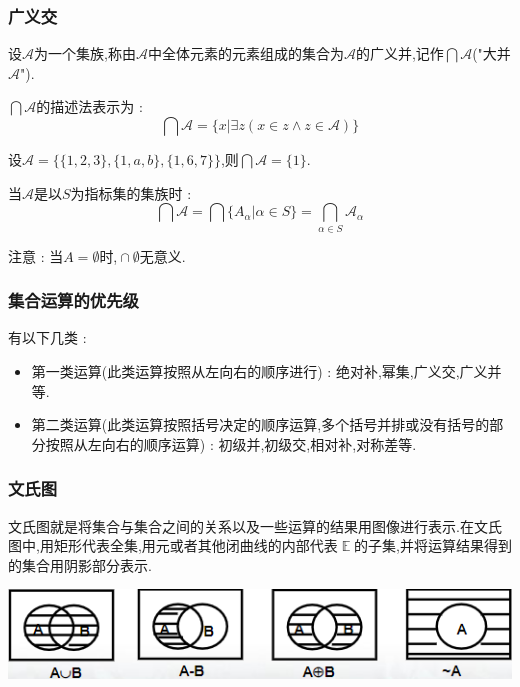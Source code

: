 \documentclass[UTF8,12pt]{ctexbook}
\DeclareMathOperator{\mathEverythingCollection}{\mathbb{E}}
\DeclareMathOperator{\intersectionSet}{\cap}
\begin{document}
{{{{\subsubsection{广义交}{
  设$\mathcal{A}$为一个集族,称由$\mathcal{A}$中全体元素的元素组成的集合为$\mathcal{A}$的广义并,记作$\bigcap \mathcal{A}$("大并$\mathcal{A}$").

  $\bigcap \mathcal{A}$的描述法表示为 : $$
    \bigcap\mathcal{A} = \{x | \exists z (x \in z \land z \in \mathcal{A})\}
  $$

  设$\mathcal{A} = \{\{1,2,3\},\{1,a,b\},\{1,6,7\}\}$,则$\bigcap \mathcal{A} = \{1\}$.

  当$\mathcal{A}$是以$S$为指标集的集族时 : $$
    \bigcap\mathcal{A} = \bigcap\{A_\alpha | \alpha \in S\} = \bigcap_{\alpha \in S}\mathcal{A}_\alpha
  $$

  注意 : 当$A = \emptyset$时,$\intersectionSet \emptyset$无意义.
}%

\subsubsection{集合运算的优先级}{
  有以下几类 :

  \begin{itemize}
    \item 第一类运算(此类运算按照从左向右的顺序进行) : 绝对补,幂集,广义交,广义并等.
    \item 第二类运算(此类运算按照括号决定的顺序运算,多个括号并排或没有括号的部分按照从左向右的顺序运算) : 初级并,初级交,相对补,对称差等.
  \end{itemize}
}%

\subsubsection{文氏图}{
  文氏图就是将集合与集合之间的关系以及一些运算的结果用图像进行表示.在文氏图中,用矩形代表全集,用元或者其他闭曲线的内部代表$\mathEverythingCollection$的子集,并将运算结果得到的集合用阴影部分表示.

  \begin{center}
    \includegraphics{resources/Venn's_diagram.png}
  \end{center}
}%

}}}}
\end{document}
